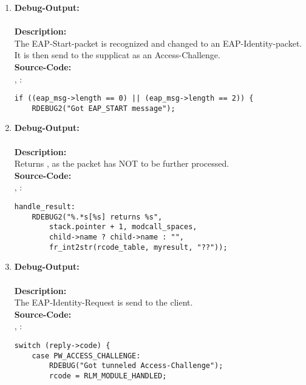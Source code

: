 \begin{enumerate}
\newpage

\item \textbf{Debug-Output:}\\
\\
\newline
\textbf{Description:}\\
The EAP-Start-packet is recognized and changed to an EAP-Identity-packet. It is then send to the supplicat as an Access-Challenge.\\
\newline
\textbf{Source-Code:}\\
, :
\begin{lstlisting}
if ((eap_msg->length == 0) || (eap_msg->length == 2)) {
	RDEBUG2("Got EAP_START message");
\end{lstlisting}

\item \textbf{Debug-Output:}\\
\\
\newline
\textbf{Description:}\\
Returns , as the packet has NOT to be further processed.\\
\newline
\textbf{Source-Code:}\\
, :
\begin{lstlisting}
handle_result:
	RDEBUG2("%.*s[%s] returns %s",
		stack.pointer + 1, modcall_spaces,
		child->name ? child->name : "",
		fr_int2str(rcode_table, myresult, "??"));
\end{lstlisting}

\item \textbf{Debug-Output:}\\
\\
\newline
\textbf{Description:}\\
The EAP-Identity-Request is send to the client.\\
\newline
\textbf{Source-Code:}\\
, :
\begin{lstlisting}
switch (reply->code) {
	case PW_ACCESS_CHALLENGE:
		RDEBUG("Got tunneled Access-Challenge");
		rcode = RLM_MODULE_HANDLED;
\end{lstlisting}
\end{enumerate}


